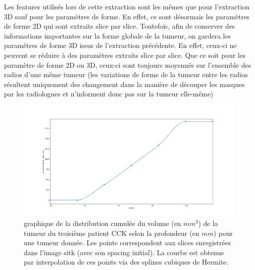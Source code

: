 \documentclass[10pt]{article}
\begin{document}
\indent Les features utilisés lors de cette extraction sont les mêmes que pour l'extraction 3D sauf pour les paramètres de forme. En effet, ce sont désormais les paramètres de forme 2D qui sont extraits slice par slice. Toutefois, afin de conserver des informations importantes sur la forme globale de la tumeur, on gardera les paramètres de forme 3D issus de l'extraction précédente. En effet, ceux-ci ne peuvent se réduire à des paramètres extraits slice par slice. Que ce soit pour les paramètre de forme 2D ou 3D, ceux-ci sont toujours moyennés sur l'ensemble des radios d'une même tumeur (les variations de forme de la tumeur entre les radios résultent uniquement des changement dans la manière de découper les masques par les radiologues et n'informent donc pas sur la tumeur elle-même)\\

\begin{figure}[tbp]
    \centering
    \includegraphics[scale = 0.25]{./images/plot_depth_volume_2.png}
    \caption{graphique de la distribution cumulée du volume (en $mm^3$) de la tumeur du troisième patient CCK selon la profondeur (en $mm$) pour une tumeur donnée. Les points correspondent aux slices enregistrées dans l'image sitk (avec son spacing initial). La courbe est obtenue par interpolation de ces points via des splines cubiques de Hermite.}
    \label{fig:depth_volume}
\end{figure}
\end{document}
